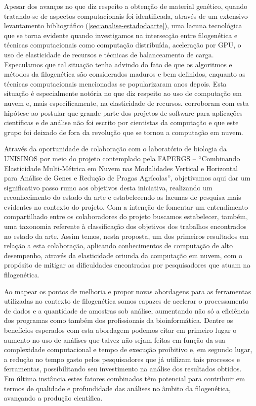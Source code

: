 \documentclass[english,brazilian]{UNISINOSmonografia} %
\begin{document}
Apesar dos avanços no que diz respeito a obtenção de material genético, quando tratando-se de aspectos computacionais foi identificada, através de um extensivo levantamento bibliográfico (\autoref{sec:analise-estadodaarte}), uma lacuna tecnológica que se torna evidente quando investigamos na intersecção entre filogenética e técnicas computacionais como computação distribuída, aceleração por GPU, o uso de elasticidade de recursos e técnicas de balanceamento de carga.
Especulamos que tal situação tenha advindo do fato de que os algoritmos e métodos da filogenética são considerados maduros e bem definidos, enquanto as técnicas computacionais mencionadas se popularizaram anos depois.
Esta situação é especialmente notória no que diz respeito ao uso de computação em nuvem e, mais especificamente, na elasticidade de recursos.
 corroboram com esta hipótese ao postular que grande parte dos projetos de software para aplicações científicas e de análise não foi escrito por cientistas da computação e que este grupo foi deixado de fora da revolução que se tornou a computação em nuvem.



Através da oportunidade de colaboração com o laboratório de biologia da UNISINOS por meio do projeto contemplado pela FAPERGS -- ``Combinando Elasticidade Multi-Métrica em Nuvem nas Modalidades Vertical e Horizontal para Análise de Genes e Redução de Pragas Agrícolas'', objetivamos aqui dar um significativo passo rumo aos objetivos desta iniciativa, realizando um reconhecimento do estado da arte e estabelecendo as lacunas de pesquisa mais evidentes no contexto do projeto.
Com a intenção de fomentar um entendimento compartilhado entre os colaboradores do projeto buscamos estabelecer, também, uma taxonomia referente à classificação dos objetivos dos trabalhos encontrados no estado da arte.
Assim temos, nesta proposta, um dos primeiros resultados em relação a esta colaboração, aplicando conhecimentos de computação de alto desempenho, através da elasticidade oriunda da computação em nuvem, com o propósito de mitigar as dificuldades encontradas por pesquisadores que atuam na filogenética.




Ao mapear os pontos de melhoria e propor novas abordagens para as ferramentas utilizadas no contexto de filogenética somos capazes de acelerar o processamento de dados e a quantidade de amostras sob análise, aumentando não só a eficiência dos programas como também dos profissionais da bioinformática.
Dentre os benefícios esperados com esta abordagem podemos citar em primeiro lugar o aumento no uso de análises que talvez não sejam feitas em função da sua complexidade computacional e tempo de execução proibitivo e, em segundo lugar, a redução no tempo gasto pelos pesquisadores que já utilizam tais processos e ferramentas, possibilitando seu investimento na análise dos resultados obtidos.
Em última instância estes fatores combinados têm potencial para contribuir em termos de qualidade e profundidade das análises no âmbito da filogenética, avançando a produção científica.
\end{document}
